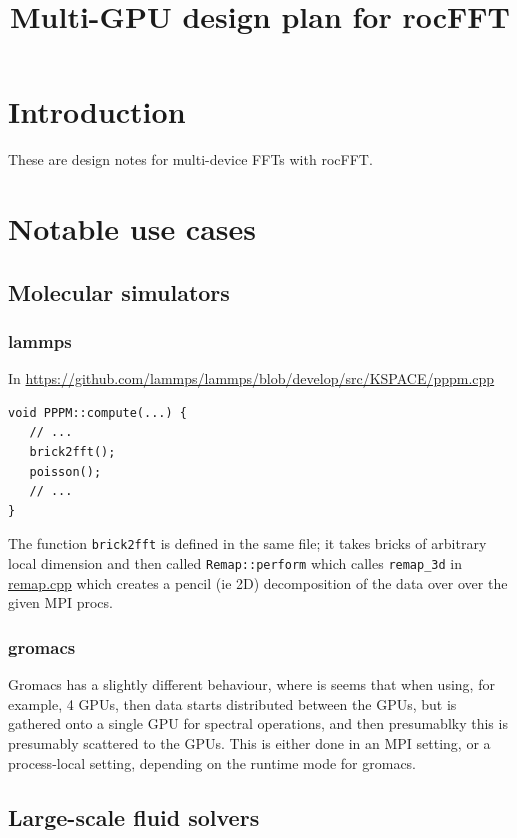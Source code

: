 \documentclass[12pt]{article}
\title{Multi-GPU design plan for rocFFT}
\author{}
\renewcommand{\(}{\left(}
\renewcommand{\)}{\right)}
\begin{document}
\maketitle

\section{Introduction}

These are design notes for multi-device FFTs with rocFFT.

\section{Notable use cases}

\subsection{Molecular simulators}

\subsubsection{lammps}
In
\url{https://github.com/lammps/lammps/blob/develop/src/KSPACE/pppm.cpp}
\begin{lstlisting}
void PPPM::compute(...) {
   // ...
   brick2fft();
   poisson();
   // ...
}
\end{lstlisting}
The function \lstinline{brick2fft} is defined in the same file; it
takes bricks of arbitrary local dimension and then called
\lstinline{Remap::perform} which calles \lstinline{remap_3d} in
\href{https://github.com/lammps/lammps/blob/develop/src/KSPACE/remap.cpp}{remap.cpp}
which creates a pencil (ie 2D) decomposition of the data over over the
given MPI procs.

\subsubsection{gromacs}
Gromacs has a slightly different behaviour, where is seems that when
using, for example, 4 GPUs, then data starts distributed between the
GPUs, but is gathered onto a single GPU for spectral operations, and
then presumablky this is presumably scattered to the GPUs.  This is
either done in an MPI setting, or a process-local setting, depending
on the runtime mode for gromacs.

\subsection{Large-scale fluid solvers}
\end{document}
